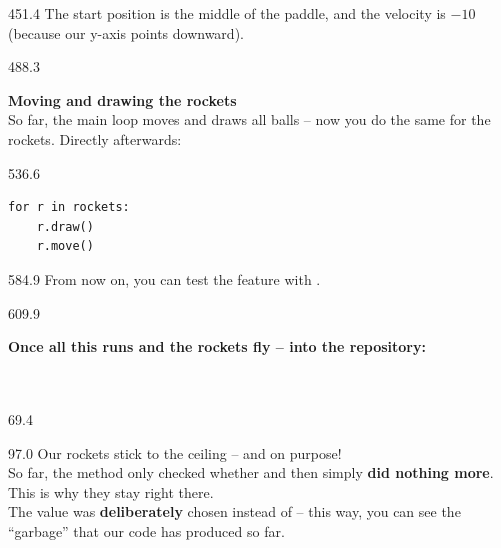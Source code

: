 \documentclass{aslab}
\begin{document}
\begin{region}[x=74.7,right=0]{451.4}
The start position is the middle of the paddle, and the velocity is $-10$
(because our y-axis points downward).
\end{region}

\begin{region}{488.3}
\begin{ntasks}[start=4]
\item \textbf{Moving and drawing the rockets}\\
  So far, the main loop moves and draws all balls -- now you do the same for
  the rockets. Directly afterwards:
\end{ntasks}
\end{region}

\begin{region}[x=74.7,right=0]{536.6}
\begin{lstlisting}[style=py]
for r in rockets:
    r.draw()
    r.move()
\end{lstlisting}
\end{region}

\begin{region}[x=74.7,right=0]{584.9}
From now on, you can test the feature with .
\end{region}

\begin{region}[pitch=12.3]{609.9}
\begin{ntasks}[start=5]
\item \textbf{Once all this runs and the rockets fly -- into the repository:}\\
  \\
  \\
\end{ntasks}
\end{region}

\nextpage
\begin{region}{69.4}
\end{region}

\begin{region}[pitch=14]{97.0}
Our rockets stick to the ceiling -- and on purpose!\\
So far, the method  only checked whether  and
then simply \textbf{did nothing more}. This is why they stay right there.\\
The value  was \textbf{deliberately} chosen instead of  --
this way, you can see the ``garbage'' that our code has produced so far.
\end{region}
\end{document}
